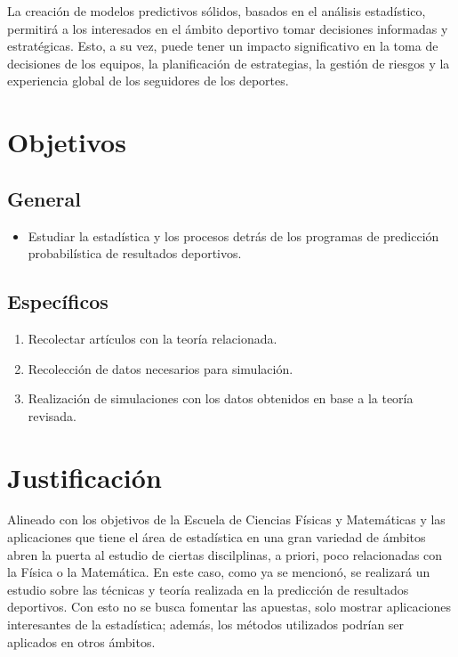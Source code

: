 \begin{titlepage}
La creación de modelos predictivos sólidos, basados en el análisis estadístico, permitirá a los interesados en el ámbito deportivo tomar decisiones informadas y estratégicas. Esto, a su vez, puede tener un impacto significativo en la toma de decisiones de los equipos, la planificación de estrategias, la gestión de riesgos y la experiencia global de los seguidores de los deportes.




\section{Objetivos}
\subsection{General}
\begin{itemize}
	\item Estudiar la estadística y los procesos detrás de los programas de predicción probabilística de resultados deportivos.
\end{itemize}

\subsection{Específicos}
\begin{enumerate}
	\item Recolectar artículos con la teoría relacionada.
	\item Recolección de datos necesarios para simulación.
	\item Realización de simulaciones con los datos obtenidos en base a la teoría revisada.
\end{enumerate}


\section{Justificación}

Alineado con los objetivos de la Escuela de Ciencias Físicas y Matemáticas y las aplicaciones que tiene el área de estadística en una gran variedad de ámbitos abren la puerta al estudio de ciertas discilplinas, a priori, poco relacionadas con la Física o la Matemática. En este caso, como ya se mencionó, se realizará un estudio sobre las técnicas y teoría realizada en la predicción de resultados deportivos. Con esto no se busca fomentar las apuestas, solo mostrar aplicaciones interesantes de la estadística; además, los métodos utilizados podrían ser aplicados en otros ámbitos.


\end{titlepage}
